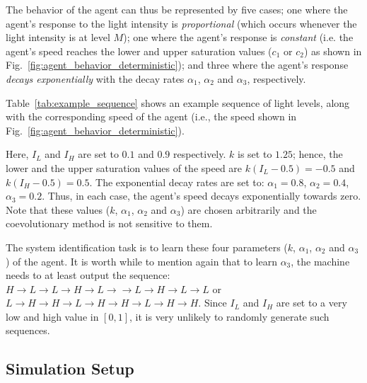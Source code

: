 The behavior of the agent can thus be represented by five cases; one where the agent's response to the light intensity is \textit{proportional} (which occurs whenever the light intensity is at level $M$); one where the agent's response is \textit{constant} (i.e. the agent's speed reaches the lower and upper saturation values ($c_1$ or $c_2$) as shown in Fig.~\ref{fig:agent_behavior_deterministic}); and three where the agent's response \textit{decays exponentially} with the decay rates $\alpha_1$, $\alpha_2$ and $\alpha_3$, respectively.

Table~\ref{tab:example_sequence} shows an example sequence of light levels, along with the corresponding speed of the agent (i.e., the speed shown in Fig.~\ref{fig:agent_behavior_deterministic}). 

Here, $I_L$ and $I_H$ are set to $0.1$ and $0.9$ respectively.  $k$ is set to $1.25$; hence, the lower and the upper saturation values of the speed are $k\left(I_L - 0.5\right) = -0.5$ and $k\left(I_H - 0.5\right) = 0.5$. The exponential decay rates are set to: $\alpha_1=0.8$, $\alpha_2=0.4$, $\alpha_3=0.2$. Thus, in each case, the agent's speed decays exponentially towards zero. Note that these values ($k$, $\alpha_1$, $\alpha_2$ and $\alpha_3$) are chosen arbitrarily and the coevolutionary method is not sensitive to them. 

The system identification task is to learn these four parameters ($k$, $\alpha_1$, $\alpha_2$ and $\alpha_3$) of the agent. It is worth while to mention again that to learn $\alpha_3$, the machine needs to at least output the sequence: $H\rightarrow L\rightarrow L\rightarrow H\rightarrow L\rightarrow \rightarrow L\rightarrow H\rightarrow L\rightarrow L$ or $L\rightarrow H\rightarrow H\rightarrow L\rightarrow H\rightarrow H\rightarrow L\rightarrow H\rightarrow H$. Since $I_L$ and $I_H$ are set to a very low and high value in $[0,1]$, it is very unlikely to randomly generate such sequences. 

\subsection{Simulation Setup}\label{sec:simulation_setup_deterministic}

